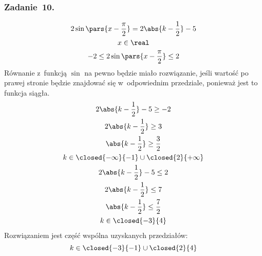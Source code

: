 \subsubsection*{Zadanie~10.}
\begin{gather*}
    2\sin\pars{x - \frac{\pi}{2}} = 2\abs{k - \frac{1}{2}} - 5\\
    x \in \real\\
    -2 \leq 2\sin\pars{x - \frac{\pi}{2}} \leq 2
\end{gather*}
Równanie z~funkcją \(\sin\) na pewno będzie miało rozwiązanie, jeśli wartość po prawej stronie będzie znajdować się w~odpowiednim przedziale, ponieważ jest to funkcja siągła.
\begin{gather*}
    2\abs{k - \frac{1}{2}} - 5 \geq -2\\
    2\abs{k - \frac{1}{2}} \geq 3\\
    \abs{k - \frac{1}{2}} \geq \frac{3}{2}\\
    k \in \closed{-\infty}{-1} \cup \closed{2}{+\infty}\\
    2\abs{k - \frac{1}{2}} - 5 \leq 2\\
    2\abs{k - \frac{1}{2}} \leq 7\\
    \abs{k - \frac{1}{2}} \leq \frac{7}{2}\\
    k \in \closed{-3}{4}
\end{gather*}
Rozwiązaniem jest część wspólna uzyskanych przedziałów:
\begin{equation*}
    k \in \closed{-3}{-1} \cup \closed{2}{4}
\end{equation*}
